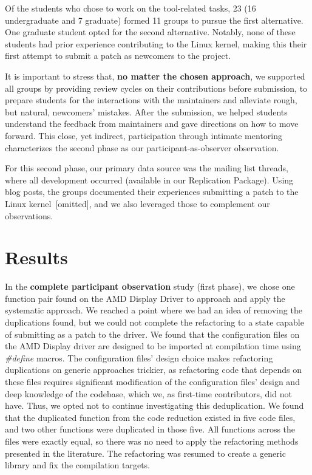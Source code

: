 \documentclass[10pt,conference]{IEEEtran}
\begin{document}
Of the students who chose to work on the tool-related tasks, 23 (16 undergraduate and 7 graduate) formed 11 groups to pursue the first alternative. One graduate student opted for the second alternative. Notably, none of these students had prior experience contributing to the Linux kernel, making this their first attempt to submit a patch as newcomers to the project.

It is important to stress that, \textbf{no matter the chosen approach}, we supported all groups by providing review cycles on their contributions before submission, to prepare students for the interactions with the maintainers and alleviate rough, but natural, newcomers' mistakes. After the submission, we helped students understand the feedback from maintainers and gave directions on how to move forward. This close, yet indirect, participation through intimate mentoring characterizes the second phase as our participant-as-observer observation.

For this second phase, our primary data source was the mailing list threads, where all development occurred (available in our Replication Package). Using blog posts, the groups documented their experiences submitting a patch to the Linux kernel~[omitted], and we also leveraged those to complement our observations. %

\section{Results}

In the \textbf{complete participant observation} study (first phase), we chose one function pair found on the AMD Display Driver to approach and apply the systematic approach.
%
We reached a point where we had an idea of removing the duplications found, but we could not complete the refactoring to a state capable of submitting as a patch to the driver. We found that the configuration files on the AMD Display driver are designed to be imported at compilation time using \textit{\#define} macros. The configuration files' design choice makes refactoring duplications on generic approaches trickier, as refactoring code that depends on these files requires significant modification of the configuration files' design and deep knowledge of the codebase, which we, as first-time contributors, did not have. Thus, we opted not to continue investigating this deduplication. We found that the duplicated function from the code reduction existed in five code files, and two other functions were duplicated in those five. All functions across the files were exactly equal, so there was no need to apply the refactoring methods presented in the literature. The refactoring was resumed to create a generic library and fix the compilation targets.
\end{document}

